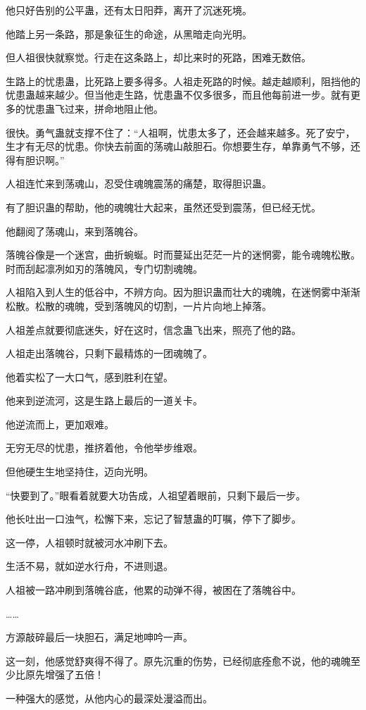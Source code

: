 \begin{this_body}
他只好告别的公平蛊，还有太日阳莽，离开了沉迷死境。

他踏上另一条路，那是象征生的命途，从黑暗走向光明。

但人祖很快就察觉。行走在这条路上，却比来时的死路，困难无数倍。

生路上的忧患蛊，比死路上要多得多。人祖走死路的时候。越走越顺利，阻挡他的忧患蛊越来越少。但当他走生路，忧患蛊不仅多很多，而且他每前进一步。就有更多的忧患蛊飞过来，拼命地阻止他。

很快。勇气蛊就支撑不住了：“人祖啊，忧患太多了，还会越来越多。死了安宁，生才有无尽的忧患。你快去前面的荡魂山敲胆石。你想要生存，单靠勇气不够，还得有胆识啊。”

人祖连忙来到荡魂山，忍受住魂魄震荡的痛楚，取得胆识蛊。

有了胆识蛊的帮助，他的魂魄壮大起来，虽然还受到震荡，但已经无忧。

他翻阅了荡魂山，来到落魄谷。

落魄谷像是一个迷宫，曲折蜿蜒。时而蔓延出茫茫一片的迷惘雾，能令魂魄松散。时而刮起凛冽如刃的落魄风，专门切割魂魄。

人祖陷入到人生的低谷中，不辨方向。因为胆识蛊而壮大的魂魄，在迷惘雾中渐渐松散。松散的魂魄，受到落魄风的切割，一片片向地上掉落。

人祖差点就要彻底迷失，好在这时，信念蛊飞出来，照亮了他的路。

人祖走出落魄谷，只剩下最精炼的一团魂魄了。

他着实松了一大口气，感到胜利在望。

他来到逆流河，这是生路上最后的一道关卡。

他逆流而上，更加艰难。

无穷无尽的忧患，推挤着他，令他举步维艰。

但他硬生生地坚持住，迈向光明。

“快要到了。”眼看着就要大功告成，人祖望着眼前，只剩下最后一步。

他长吐出一口浊气，松懈下来，忘记了智慧蛊的叮嘱，停下了脚步。

这一停，人祖顿时就被河水冲刷下去。

生活不易，就如逆水行舟，不进则退。

人祖被一路冲刷到落魄谷底，他累的动弹不得，被困在了落魄谷中。

……

方源敲碎最后一块胆石，满足地呻吟一声。

这一刻，他感觉舒爽得不得了。原先沉重的伤势，已经彻底痊愈不说，他的魂魄至少比原先增强了五倍！

一种强大的感觉，从他内心的最深处漫溢而出。


\end{this_body}
